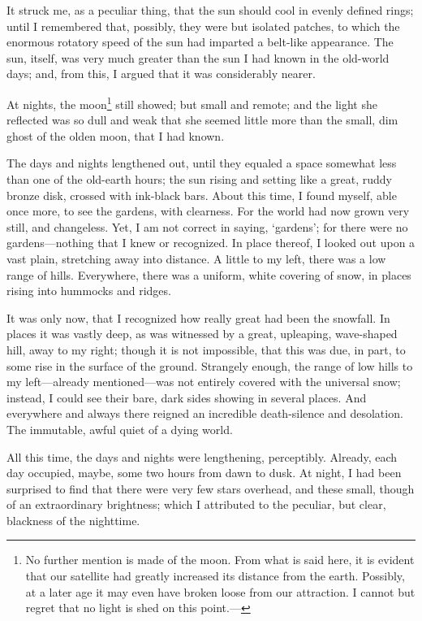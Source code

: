 It struck me, as a peculiar thing, that the sun should cool in evenly defined rings; until I remembered that, possibly, they were but isolated patches, to which the enormous rotatory speed of the sun had imparted a belt-like appearance. The sun, itself, was very much greater than the sun I had known in the old-world days; and, from this, I argued that it was considerably nearer.

At nights, the moon\footnote{No further mention is made of the moon. From what is said here, it is evident that our satellite had greatly increased its distance from the earth. Possibly, at a later age it may even have broken loose from our attraction. I cannot but regret that no light is shed on this point.---} still showed; but small and remote; and the light she reflected was so dull and weak that she seemed little more than the small, dim ghost of the olden moon, that I had known.

The days and nights lengthened out, until they equaled a space somewhat less than one of the old-earth hours; the sun rising and setting like a great, ruddy bronze disk, crossed with ink-black bars. About this time, I found myself, able once more, to see the gardens, with clearness. For the world had now grown very still, and changeless. Yet, I am not correct in saying, ‘gardens’; for there were no gardens---nothing that I knew or recognized. In place thereof, I looked out upon a vast plain, stretching away into distance. A little to my left, there was a low range of hills. Everywhere, there was a uniform, white covering of snow, in places rising into hummocks and ridges.

It was only now, that I recognized how really great had been the snowfall. In places it was vastly deep, as was witnessed by a great, upleaping, wave-shaped hill, away to my right; though it is not impossible, that this was due, in part, to some rise in the surface of the ground. Strangely enough, the range of low hills to my left---already mentioned---was not entirely covered with the universal snow; instead, I could see their bare, dark sides showing in several places. And everywhere and always there reigned an incredible death-silence and desolation. The immutable, awful quiet of a dying world.

All this time, the days and nights were lengthening, perceptibly. Already, each day occupied, maybe, some two hours from dawn to dusk. At night, I had been surprised to find that there were very few stars overhead, and these small, though of an extraordinary brightness; which I attributed to the peculiar, but clear, blackness of the nighttime.

